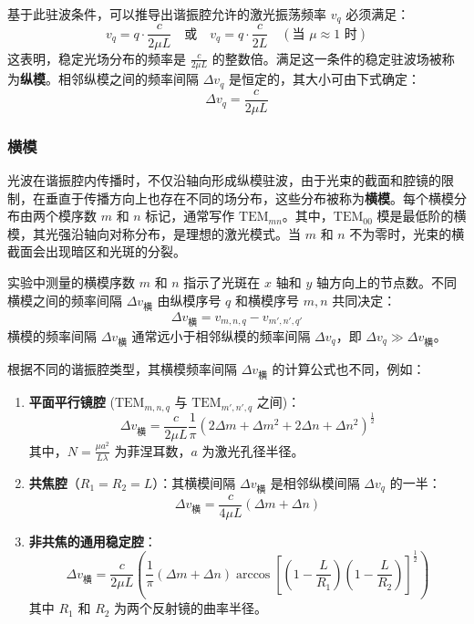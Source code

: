 \documentclass[a4paper, 1.5lines]{ctexart}
\begin{document}
            基于此驻波条件，可以推导出谐振腔允许的激光振荡频率 $v_q$ 必须满足：
            $$
            v_q = q \cdot \frac{c}{2\mu L}
            \quad \text{或} \quad
            v_q = q \cdot \frac{c}{2L} \quad (\text{当 } \mu \approx 1 \text{ 时})
            $$
            这表明，稳定光场分布的频率是 $\frac{c}{2\mu L}$ 的整数倍。满足这一条件的稳定驻波场被称为\textbf{纵模}。相邻纵模之间的频率间隔 $\Delta v_q$ 是恒定的，其大小可由下式确定：
            $$
            \Delta v_q = \frac{c}{2\mu L}
            $$
            
            \subsubsection{横模}
            光波在谐振腔内传播时，不仅沿轴向形成纵模驻波，由于光束的截面和腔镜的限制，在垂直于传播方向上也存在不同的场分布，这些分布被称为\textbf{横模}。每个横模分布由两个模序数 $m$ 和 $n$ 标记，通常写作 $\text{TEM}_{mn}$。其中，$\text{TEM}_{00}$ 模是最低阶的横模，其光强沿轴向对称分布，是理想的激光模式。当 $m$ 和 $n$ 不为零时，光束的横截面会出现暗区和光斑的分裂。

            实验中测量的横模序数 $m$ 和 $n$ 指示了光斑在 $x$ 轴和 $y$ 轴方向上的节点数。不同横模之间的频率间隔 $\Delta v_{\text{横}}$ 由纵模序号 $q$ 和横模序号 $m, n$ 共同决定：
            $$
            \Delta v_{\text{横}} = v_{m,n,q} - v_{m',n',q'}
            $$
            横模的频率间隔 $\Delta v_{\text{横}}$ 通常远小于相邻纵模的频率间隔 $\Delta v_q$，即 $\Delta v_q \gg \Delta v_{\text{横}}$。

            根据不同的谐振腔类型，其横模频率间隔 $\Delta v_{\text{横}}$ 的计算公式也不同，例如：

            \begin{enumerate}
                \item \textbf{平面平行镜腔} ($\text{TEM}_{m,n,q}$ 与 $\text{TEM}_{m',n',q}$ 之间)：
                $$
                \Delta v_{\text{横}} = \frac{c}{2\mu L} \frac{1}{\pi} \left(2\Delta m + \Delta m^2 + 2\Delta n + \Delta n^2\right)^{\frac{1}{2}}
                $$
                其中，$N = \frac{\mu a^2}{L\lambda}$ 为菲涅耳数，$a$ 为激光孔径半径。
    
                \item \textbf{共焦腔}（$R_1=R_2=L$）：其横模间隔 $\Delta v_{\text{横}}$ 是相邻纵模间隔 $\Delta v_q$ 的一半：
                $$
                \Delta v_{\text{横}} = \frac{c}{4\mu L} (\Delta m + \Delta n)
                $$
    
                \item \textbf{非共焦的通用稳定腔}：
                $$
                \Delta v_{\text{横}} = \frac{c}{2\mu L} \left(\frac{1}{\pi} (\Delta m + \Delta n) \arccos\left[\left(1-\frac{L}{R_1}\right)\left(1-\frac{L}{R_2}\right)\right]^{\frac{1}{2}}\right)
                $$
                其中 $R_1$ 和 $R_2$ 为两个反射镜的曲率半径。
            \end{enumerate}
\end{document}
